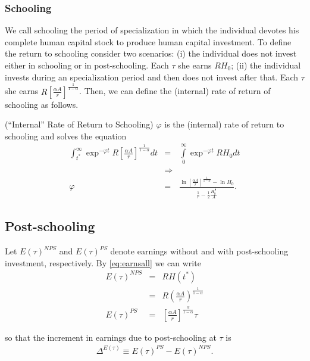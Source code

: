 \subsubsection{Schooling}
We call schooling the period of specialization in which the individual devotes his complete human capital stock to produce human capital investment. To define the return to schooling consider two scenarios: (i) the individual does not invest either in schooling or in post-schooling. Each $\tau$ she earns $RH_{0}$; (ii) the individual invests during an specialization period and then does not invest after that. Each $\tau$ she earns $R \left[ \frac{\alpha A}{r} \right]^{\frac{1}{1-\alpha}}$. Then, we can define the (internal) rate of return of schooling as follows.

\begin{definition} (``Internal'' Rate of Return to Schooling)
$\varphi$ is the (internal) rate of return to schooling and solves the equation
\begin{eqnarray}
\int _{t^*} ^{\infty} \exp^{- \varphi t} R \left[ \frac{\alpha A}{r} \right]^{\frac{1}{1-\alpha}} dt &=& \int \limits _{0} ^{\infty} \exp^{- \varphi t} R H_{0} dt \nonumber \\
&\Rightarrow& \nonumber \\
\varphi &=& \frac{\ln \left[ \frac{\alpha A}{r} \right]^{\frac{1}{1 - \alpha}} - \ln H_{0}}{\frac{1}{r} - \frac{1}{2} \frac{H_{0}^{\frac{1}{2}}}{A}}.
\end{eqnarray}
\end{definition}

\subsection{Post-schooling}
Let $E(\tau)^{NPS}$ and $E(\tau)^{PS}$ denote earnings without and with post-schooling investment, respectively. By \eqref{eq:earnsall} we can write
\begin{eqnarray}
E(\tau)^{NPS} &=& R H(t^*) \\ \nonumber
&=& R \left( \frac{\alpha A}{r} \right)^{\frac{1}{1 - \alpha}} \\ \nonumber
E(\tau)^{PS} &=& \left[ \frac{\alpha A}{r} \right]^{\frac{\alpha}{1-\alpha}} \tau
\end{eqnarray}

\noindent so that the increment in earnings due to post-schooling at $\tau$ is
\begin{eqnarray}
\Delta^{E(\tau)} \equiv E(\tau)^{PS} - E(\tau)^{NPS}.
\end{eqnarray}

